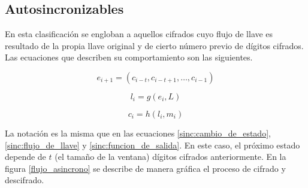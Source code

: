 %
%

\subsection{Autosincronizables}

En esta clasificación se engloban a aquellos cifrados cuyo flujo de llave es
resultado de la propia llave original y de cierto número previo de dígitos
cifrados. Las ecuaciones que describen su comportamiento son las siguientes.

\begin{equation}
  \label{asinc:cambio_de_estado}
  e_{i+1} = (c_{i - t}, c_{i - t + 1}, \dots, c_{i - 1})
\end{equation}

\begin{equation}
  \label{asinc:flujo_de_llave}
  l_i = g(e_i, L)
\end{equation}

\begin{equation}
  \label{asinc:funcion_de_salida}
  c_i = h(l_i, m_i)
\end{equation}

\vspace{0.5cm}

La notación es la misma que en las ecuaciones \ref{sinc:cambio_de_estado},
\ref{sinc:flujo_de_llave} y \ref{sinc:funcion_de_salida}. En este caso, el
próximo estado depende de $ t $ (el tamaño de la ventana) dígitos cifrados
anteriormente. En la figura \ref{flujo_asincrono} se describe de manera
gráfica el proceso de cifrado y descifrado.

\vspace{0.5cm}

